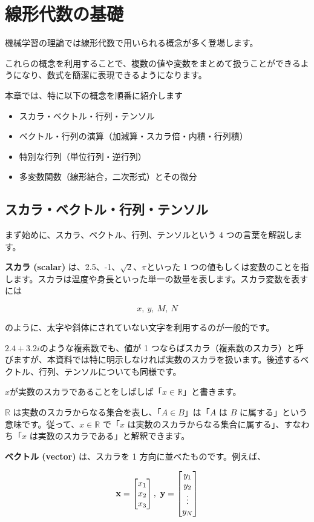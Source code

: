 \chapter{線形代数の基礎}


機械学習の理論では線形代数で用いられる概念が多く登場します。

これらの概念を利用することで、複数の値や変数をまとめて扱うことができるようになり、数式を簡潔に表現できるようになります。

本章では、特に以下の概念を順番に紹介します


\begin{itemize}
\item スカラ・ベクトル・行列・テンソル
\item ベクトル・行列の演算（加減算・スカラ倍・内積・行列積）
\item 特別な行列（単位行列・逆行列）
\item 多変数関数（線形結合，二次形式）とその微分
\end{itemize}


\section{スカラ・ベクトル・行列・テンソル}


まず始めに、スカラ、ベクトル、行列、テンソルという 4 つの言葉を解説します。


\textbf{スカラ (scalar)} は、2.5、-1、$\sqrt{2}$、$\pi$といった 1 つの値もしくは変数のことを指します。スカラは温度や身長といった単一の数量を表します。スカラ変数を表すには


\[
x, \ y,\  M,\  N
\]


のように、太字や斜体にされていない文字を利用するのが一般的です。

$2.4+3.2i$のような複素数でも、値が 1 つならばスカラ（複素数のスカラ）と呼びますが、本資料では特に明示しなければ実数のスカラを扱います。後述するベクトル、行列、テンソルについても同様です。


$x$が実数のスカラであることをしばしば「$x\in \mathbb{R}$」と書きます。

$\mathbb{R}$ は実数のスカラからなる集合を表し、「$A\in B$」は「$A$ は $B$ に属する」という意味です。従って、$x\in \mathbb{R}$ で「$x$ は実数のスカラからなる集合に属する」、すなわち「$x$ は実数のスカラである」と解釈できます。



\textbf{ベクトル (vector)} は、スカラを 1 方向に並べたものです。例えば、


\[
{\bf x}=\begin{bmatrix}
x_{1} \\
x_{2} \\
x_{3}
\end{bmatrix}, \
{\bf y}=\begin{bmatrix}
y_{1} \\
y_{2} \\
\vdots \\
y_{N}
\end{bmatrix}
\]


